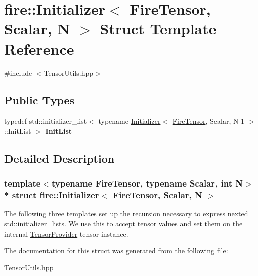 \hypertarget{a00158}{}\section{fire\+:\+:Initializer$<$ Fire\+Tensor, Scalar, N $>$ Struct Template Reference}
\label{a00158}


{\ttfamily \#include $<$Tensor\+Utils.\+hpp$>$}

\subsection*{Public Types}
\begin{DoxyCompactItemize}
\item 
typedef std\+::initializer\+\_\+list$<$ typename \hyperlink{a00158}{Initializer}$<$ \hyperlink{a00299}{Fire\+Tensor}, Scalar, N-\/1 $>$\+::Init\+List $>$ {\bfseries Init\+List}\hypertarget{a00158_aeb5626b5276d5c021ba8971b2d524c45}{}\label{a00158_aeb5626b5276d5c021ba8971b2d524c45}

\end{DoxyCompactItemize}


\subsection{Detailed Description}
\subsubsection*{template$<$typename Fire\+Tensor, typename Scalar, int N$>$\\*
struct fire\+::\+Initializer$<$ Fire\+Tensor, Scalar, N $>$}

The following three templates set up the recursion necessary to express nexted std\+::initializer\+\_\+lists. We use this to accept tensor values and set them on the internal \hyperlink{a00300}{Tensor\+Provider} tensor instance. 

The documentation for this struct was generated from the following file\+:\begin{DoxyCompactItemize}
\item 
Tensor\+Utils.\+hpp\end{DoxyCompactItemize}
